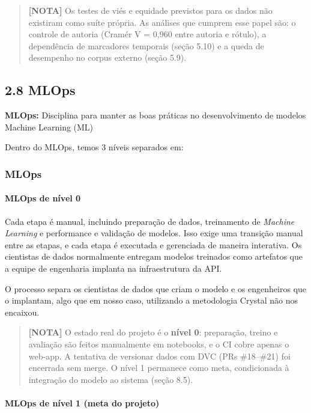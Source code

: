 \documentclass[
  brazilian,
  11pt,
]{article}
\begin{document}
\begin{quote}
\textbf{{[}NOTA{]}} Os testes de viés e equidade previstos para os dados não existiram como suíte própria. As análises que cumprem esse papel são: o controle de autoria (Cramér V = 0,960 entre autoria e rótulo), a dependência de marcadores temporais (seção 5.10) e a queda de desempenho no corpus externo (seção 5.9).
\end{quote}

\subsection{2.8 MLOps}\label{mlops}

\textbf{MLOps:} Disciplina para manter as boas práticas no desenvolvimento de modelos Machine Learning (ML)

Dentro do MLOps, temos 3 níveis separados em:

\subsubsection{\texorpdfstring{\textbf{MLOps}}{MLOps}}\label{mlops-1}

\paragraph{MLOps de nível 0}\label{mlops-de-nuxedvel-0}

Cada etapa é manual, incluindo preparação de dados, treinamento de \emph{Machine Learning} e performance e validação de modelos. Isso exige uma transição manual entre as etapas, e cada etapa é executada e gerenciada de maneira interativa. Os cientistas de dados normalmente entregam modelos treinados como artefatos que a equipe de engenharia implanta na infraestrutura da API.

O processo separa os cientistas de dados que criam o modelo e os engenheiros que o implantam, algo que em nosso caso, utilizando a metodologia Crystal não nos encaixou.

\begin{quote}
\textbf{{[}NOTA{]}} O estado real do projeto é o \textbf{nível 0}: preparação, treino e avaliação são feitos manualmente em notebooks, e o CI cobre apenas o web-app. A tentativa de versionar dados com DVC (PRs \#18--\#21) foi encerrada sem merge. O nível 1 permanece como meta, condicionada à integração do modelo ao sistema (seção 8.5).
\end{quote}

\paragraph{MLOps de nível 1 (meta do projeto)}\label{mlops-de-nuxedvel-1-meta-do-projeto}
\end{document}

